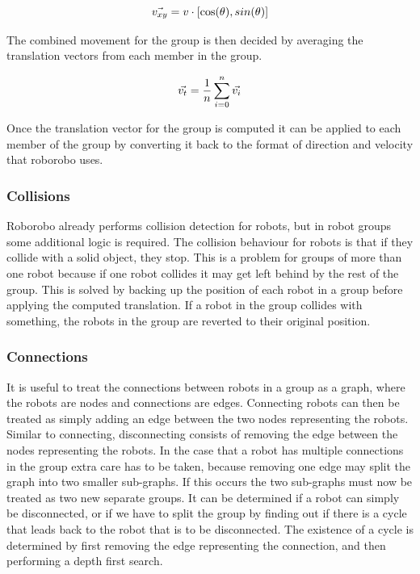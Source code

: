 \begin{equation}
	\centering
	\vec{v_{xy}} = v\cdot[\cos(\theta), sin(\theta)]
\end{equation}
	
The combined movement for the group is then decided by averaging the translation vectors from each member in the group.
	
\begin{equation}
	\centering
	\vec{v_t} = \frac{1}{n}\sum_{i=0}^{n} \vec{v_{i}}
\end{equation}
	
Once the translation vector for the group is computed it can be applied to each member of the group by converting it back to the format of direction and velocity that roborobo uses.
	
\subsubsection{Collisions}
Roborobo already performs collision detection for robots, but in robot groups some additional logic is required.
The collision behaviour for robots is that if they collide with a solid object, they stop.
This is a problem for groups of more than one robot because if one robot collides it may get left behind by the rest of the group.
This is solved by backing up the position of each robot in a group before applying the computed translation.
If a robot in the group collides with something, the robots in the group are reverted to their original position.

\subsubsection{Connections}
It is useful to treat the connections between robots in a group as a graph, where the robots are nodes and connections are edges.
Connecting robots can then be treated as simply adding an edge between the two nodes representing the robots.
Similar to connecting, disconnecting consists of removing the edge between the nodes representing the robots.
In the case that a robot has multiple connections in the group extra care has to be taken, because removing one edge may split the graph into two smaller sub-graphs.
If this occurs the two sub-graphs must now be treated as two new separate groups.
It can be determined if a robot can simply be disconnected, or if we have to split the group by finding out if there is a cycle that leads back to the robot that is to be disconnected.
The existence of a cycle is determined by first removing the edge representing the connection, and then performing a depth first search.
	
